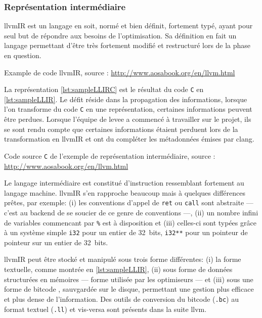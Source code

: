 \subsubsection{Représentation intermédiaire}

\gls{llvmIR} est un langage en soit, normé et bien définit, fortement typé, ayant pour seul but de répondre aux besoins de l'optimisation. Sa définition en fait un langage permettant d'être très fortement modifié et restructuré lors de la phase en question.

\begin{listing}
	\caption{Example de code \gls{llvmIR}, source : \url{http://www.aosabook.org/en/llvm.html}}
	\label{lst:sampleLLIR}
\end{listing}

La représentation \autoref{lst:sampleLLIRC} est le résultat du code \texttt{C} en \autoref{lst:sampleLLIR}. Le défit réside dans la propagation des informations, lorsque l'on transforme du code \texttt{C} en une représentation, certaines informations peuvent être perdues. Lorsque l'équipe de \gls{levee} a commencé à travailler sur le projet, ils se sont rendu compte que certaines informations étaient perduent lors de la transformation en \gls{llvmIR} et ont du compléter les métadonnées émises par \gls{clang}.

\begin{listing}
	\caption{Code source \texttt{C} de l'exemple de représentation intermédiaire, source : \url{http://www.aosabook.org/en/llvm.html}}
	\label{lst:sampleLLIRC}
\end{listing}

Le langage intermédiaire est constitué d'instruction ressemblant fortement au langage machine. \gls{llvmIR} s'en rapproche beaucoup mais à quelques différences prêtes, par exemple: (i) les conventions d'appel de \texttt{ret} ou \texttt{call} sont abstraite --- c'est au \og backend \fg de se soucier de ce genre de conventions ---, (ii) un nombre infini de variables commencant par \texttt{\%} est à disposition et (iii) celles-ci sont typées grâce à un système simple \texttt{i32} pour un entier de 32~bits, \texttt{i32**} pour un pointeur de pointeur sur un entier de 32~bits.

\gls{llvmIR} peut être stocké et manipulé sous trois forme différentes: (i) la forme textuelle, comme montrée en \autoref{lst:sampleLLIR}, (ii) sous forme de données structurées en mémoires --- forme utilisée par les optimiseurs --- et (iii) sous une forme de \og bitcode \fg, sauvgardée sur le disque, permettant une gestion plus efficace et plus dense de l'information. Des outils de conversion du \og bitcode \fg (\texttt{.bc}) au format textuel (\texttt{.ll}) et vis-versa sont présents dans la suite \gls{llvm}.

